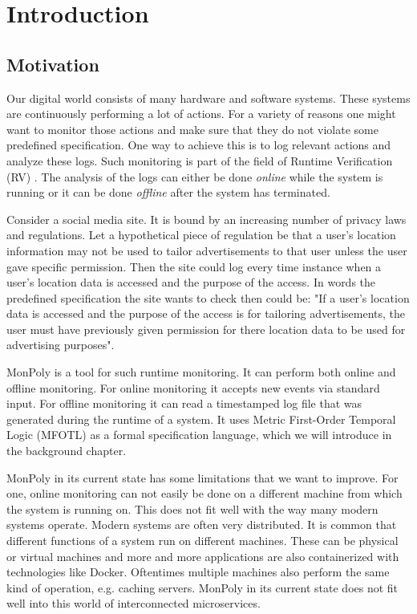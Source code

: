 \chapter{Introduction}

\section{Motivation}

Our digital world consists of many hardware and software systems.
These systems are continuously performing a lot of actions.
For a variety of reasons one might want to monitor those actions and make sure that they do not violate some predefined specification.
One way to achieve this is to log relevant actions and analyze these logs.
Such monitoring is part of the field of Runtime Verification (RV) \cite{Bartocci2018}.
The analysis of the logs can either be done \textit{online} while the system is running or it can be done \textit{offline} after the system has terminated.

Consider a social media site.
It is bound by an increasing number of privacy laws and regulations.
Let a hypothetical piece of regulation be that a user's location information may not be used to tailor advertisements to that user unless the user gave specific permission.
Then the site could log every time instance when a user's location data is accessed and the purpose of the access.
In words the predefined specification the site wants to check then could be:
    "If a user's location data is accessed and the purpose of the access is for tailoring advertisements, the user must have previously given permission for there location data to be used for advertising purposes".

MonPoly \cite{Basin2017} is a tool for such runtime monitoring.
It can perform both online and offline monitoring.
For online monitoring it accepts new events via standard input.
For offline monitoring it can read a timestamped log file that was generated during the runtime of a system.
It uses Metric First-Order Temporal Logic (MFOTL) \cite{Basin2008, Basin2015, Chomicki1995} as a formal specification language, which we will introduce in the background chapter.

MonPoly in its current state has some limitations that we want to improve.
For one, online monitoring can not easily be done on a different machine from which the system is running on.
This does not fit well with the way many modern systems operate.
Modern systems are often very distributed.
It is common that different functions of a system run on different machines.
These can be physical or virtual machines and more and more applications are also containerized with technologies like Docker.
Oftentimes multiple machines also perform the same kind of operation, e.g. caching servers.
MonPoly in its current state does not fit well into this world of interconnected microservices.

